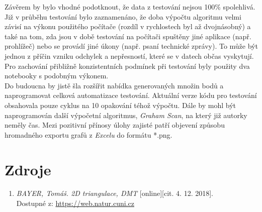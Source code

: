 \documentclass[a4paper, 12pt]{article}
\begin{document}
Závěrem by bylo vhodné podotknout, že data z testování nejsou 100\% spolehlivá. Již v průběhu testování bylo zaznamenáno, že doba výpočtu algoritmu velmi závisí na výkonu použitého počítače (rozdíl v rychlostech byl až dvojnásobný) a také na tom, zda jsou v době testování na počítači spuštěny jiné aplikace (např. prohlížeč) nebo se provádí jiné úkony (např. psaní technické zprávy). To může být jednou z příčin vzniku odchylek a nepřesností, které se v datech občas vyskytují. Pro zachování přibližně konzistentních podmínek při testování byly použity dva notebooky s podobným výkonem.\\

Do budoucna by jistě šla rozšířit nabídka generovaných množin bodů a naprogramovat celková automatizace testování. Aktuální verze kódu pro testování obsahovala pouze cyklus na 10 opakování téhož výpočtu. Dále by mohl být naprogramován další výpočetní algoritmus, \textit{Graham Scan}, na který již autorky neměly čas. Mezi pozitivní přínosy úlohy zajisté patří objevení způsobu hromadného exportu grafů z \textit{Excelu} do formátu *.png.

\clearpage

\section{Zdroje}
\begin{enumerate}
\item  \textsl{BAYER, Tomáš. 2D triangulace, DMT} [online][cit. 4. 12. 2018].\\
Dostupné z: \href{https://web.natur.cuni.cz/~bayertom/images/courses/Adk/adk5.pdf}{https://web.natur.cuni.cz}



\end{enumerate}
\end{document}

